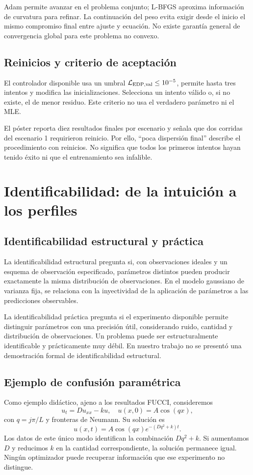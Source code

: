 \documentclass[11pt,a4paper]{report}
\begin{document}
Adam permite avanzar en el problema conjunto; L-BFGS aproxima información de curvatura para refinar. La continuación del peso evita exigir desde el inicio el mismo compromiso final entre ajuste y ecuación. No existe garantía general de convergencia global para este problema no convexo.

\section{Reinicios y criterio de aceptación}
El controlador disponible usa un umbral $\mathcal L_{\rm EDP,val}\le10^{-5}$, permite hasta tres intentos y modifica las inicializaciones. Selecciona un intento válido o, si no existe, el de menor residuo. Este criterio no usa el verdadero parámetro ni el MLE.

El póster reporta diez resultados finales por escenario y señala que dos corridas del escenario 1 requirieron reinicio. Por ello, ``poca dispersión final'' describe el procedimiento con reinicios. No significa que todos los primeros intentos hayan tenido éxito ni que el entrenamiento sea infalible.



\chapter{Identificabilidad: de la intuición a los perfiles}
\section{Identificabilidad estructural y práctica}
La identificabilidad estructural pregunta si, con observaciones ideales y un esquema de observación especificado, parámetros distintos pueden producir exactamente la misma distribución de observaciones. En el modelo gaussiano de varianza fija, se relaciona con la inyectividad de la aplicación de parámetros a las predicciones observables.

La identificabilidad práctica pregunta si el experimento disponible permite distinguir parámetros con una precisión útil, considerando ruido, cantidad y distribución de observaciones. Un problema puede ser estructuralmente identificable y prácticamente muy débil. En nuestro trabajo no se presentó una demostración formal de identificabilidad estructural.

\section{Ejemplo de confusión paramétrica}
Como ejemplo didáctico, ajeno a los resultados FUCCI, consideremos
\[
u_t=Du_{xx}-ku,\quad u(x,0)=A\cos(qx),
\]
con $q=j\pi/L$ y fronteras de Neumann. Su solución es
\[
u(x,t)=A\cos(qx)e^{-(Dq^2+k)t}.
\]
Los datos de este único modo identifican la combinación $Dq^2+k$. Si aumentamos $D$ y reducimos $k$ en la cantidad correspondiente, la solución permanece igual. Ningún optimizador puede recuperar información que ese experimento no distingue.
\end{document}
